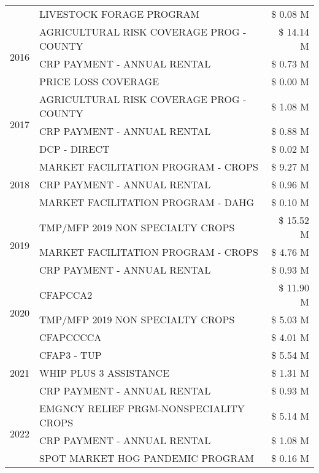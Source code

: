 \begin{tabular}{llr}
 & LIVESTOCK FORAGE PROGRAM & \$ 0.08 M \\
\cline{1-3}
\multirow[t]{3}{*}{2016} & AGRICULTURAL RISK COVERAGE PROG - COUNTY & \$ 14.14 M \\
 & CRP PAYMENT - ANNUAL RENTAL & \$ 0.73 M \\
 & PRICE LOSS COVERAGE & \$ 0.00 M \\
\cline{1-3}
\multirow[t]{3}{*}{2017} & AGRICULTURAL RISK COVERAGE PROG - COUNTY & \$ 1.08 M \\
 & CRP PAYMENT - ANNUAL RENTAL & \$ 0.88 M \\
 & DCP - DIRECT & \$ 0.02 M \\
\cline{1-3}
\multirow[t]{3}{*}{2018} & MARKET FACILITATION PROGRAM - CROPS & \$ 9.27 M \\
 & CRP PAYMENT - ANNUAL RENTAL & \$ 0.96 M \\
 & MARKET FACILITATION PROGRAM - DAHG & \$ 0.10 M \\
\cline{1-3}
\multirow[t]{3}{*}{2019} & TMP/MFP 2019 NON SPECIALTY CROPS & \$ 15.52 M \\
 & MARKET FACILITATION PROGRAM - CROPS & \$ 4.76 M \\
 & CRP PAYMENT - ANNUAL RENTAL & \$ 0.93 M \\
\cline{1-3}
\multirow[t]{3}{*}{2020} & CFAPCCA2 & \$ 11.90 M \\
 & TMP/MFP 2019 NON SPECIALTY CROPS & \$ 5.03 M \\
 & CFAPCCCCA & \$ 4.01 M \\
\cline{1-3}
\multirow[t]{3}{*}{2021} & CFAP3 - TUP & \$ 5.54 M \\
 & WHIP PLUS 3 ASSISTANCE & \$ 1.31 M \\
 & CRP PAYMENT - ANNUAL RENTAL & \$ 0.93 M \\
\cline{1-3}
\multirow[t]{3}{*}{2022} & EMGNCY RELIEF PRGM-NONSPECIALITY CROPS & \$ 5.14 M \\
 & CRP PAYMENT - ANNUAL RENTAL & \$ 1.08 M \\
 & SPOT MARKET HOG PANDEMIC PROGRAM & \$ 0.16 M \\
\cline{1-3}
\bottomrule
\end{tabular}
